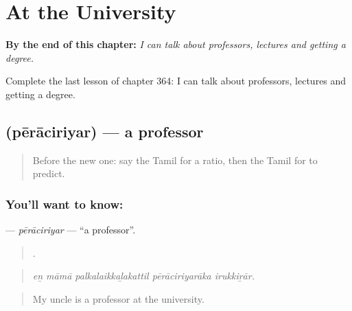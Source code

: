 
\chapter{At the University}
\label{ch:ta-at-the-university}

\begin{chapteropening}
\textbf{By the end of this chapter:} \emph{I can talk about professors, lectures and getting a degree.}

Complete the last lesson of chapter 364: I can talk about professors, lectures and getting a degree.
\end{chapteropening}

\section[\texorpdfstring{\ta{பேராசிரியர்} (pērāciriyar)}{பேராசிரியர் (pērāciriyar)}]{ (pērāciriyar) — a professor}

\label{lesson:TA-C364-peraciriyar}



\begin{quote}
Before the new one: say the Tamil for a ratio, then the Tamil for to predict.
\end{quote}

\subsection*{You'll want to know: }
\textbf{} — \emph{pērāciriyar} — \textquotedblleft{}a professor\textquotedblright{}.

\begin{quote}
    .
\end{quote}

\begin{quote}
\emph{eṉ māmā palkalaikkaḻakattil pērāciriyarāka irukkiṟār.}
\end{quote}

\begin{quote}
My uncle is a professor at the university.
\end{quote}

